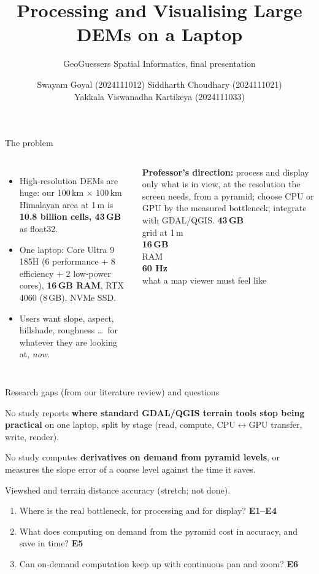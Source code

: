 \documentclass[aspectratio=169,11pt]{beamer}
\title{Processing and Visualising Large DEMs on a Laptop}
\subtitle{GeoGuessers \textbar{} Spatial Informatics, final presentation}
\author{Swayam Goyal (2024111012) \quad Siddharth Choudhary (2024111021)\\Yakkala Viswanadha Kartikeya (2024111033)}
\date{}
\newcommand{\bignum}[1]{{\Large\bfseries\color{ggblue}#1}}
\begin{document}
\maketitle

\begin{frame}{The problem}
\small
\begin{columns}[T]
\begin{itemize}
  \item High-resolution DEMs are huge: our 100\,km $\times$ 100\,km Himalayan area at 1\,m is \textbf{10.8 billion
  cells, 43\,GB} as float32.
  \item One laptop: Core Ultra 9 185H (6 performance + 8 efficiency + 2 low-power cores), \textbf{16\,GB RAM},
  RTX 4060 (8\,GB), NVMe SSD.
  \item Users want slope, aspect, hillshade, roughness \ldots\ for whatever they are looking at, \emph{now}.
\end{itemize}
\vspace{6pt}
\textbf{Professor's direction:} process and display \alert{only what is in view}, at the resolution the screen
needs, from a pyramid; choose CPU or GPU by the \alert{measured} bottleneck; integrate with GDAL/QGIS.
\centering
\bignum{43\,GB}\\[-2pt]{\small grid at 1\,m}\\[10pt]
\bignum{16\,GB}\\[-2pt]{\small RAM}\\[10pt]
\bignum{60 Hz}\\[-2pt]{\small what a map viewer must feel like}
\end{columns}
\end{frame}

\begin{frame}{Research gaps (from our literature review) and questions}
\begin{description}[G1]
  \item[G1] No study reports \textbf{where standard GDAL/QGIS terrain tools stop being practical} on one laptop,
  split by stage (read, compute, CPU$\leftrightarrow$GPU transfer, write, render).
  \item[G2] No study computes \textbf{derivatives on demand from pyramid levels}, or measures the slope error of a
  coarse level against the time it saves.
  \item[G3] Viewshed and terrain distance accuracy (stretch; not done).
\end{description}
\vspace{6pt}
\begin{enumerate}
  \item Where is the real bottleneck, for processing and for display? \hfill \textbf{E1--E4}
  \item What does computing on demand from the pyramid cost in accuracy, and save in time? \hfill \textbf{E5}
  \item Can on-demand computation keep up with continuous pan and zoom? \hfill \textbf{E6}
\end{enumerate}
\end{frame}
\end{document}
